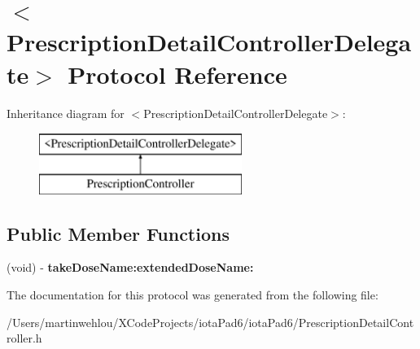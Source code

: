 \hypertarget{protocol_prescription_detail_controller_delegate-p}{
\section{$<$PrescriptionDetailControllerDelegate$>$ Protocol Reference}
\label{protocol_prescription_detail_controller_delegate-p}
}
Inheritance diagram for $<$PrescriptionDetailControllerDelegate$>$:\begin{figure}[H]
\begin{center}
\leavevmode
\includegraphics[height=2.000000cm]{protocol_prescription_detail_controller_delegate-p}
\end{center}
\end{figure}
\subsection*{Public Member Functions}
\begin{DoxyCompactItemize}
\item 
\hypertarget{protocol_prescription_detail_controller_delegate-p_a8622b6c9b94bb58b90e0f7d518f74ef1}{
(void) -\/ {\bfseries takeDoseName:extendedDoseName:}}
\label{protocol_prescription_detail_controller_delegate-p_a8622b6c9b94bb58b90e0f7d518f74ef1}

\end{DoxyCompactItemize}


The documentation for this protocol was generated from the following file:\begin{DoxyCompactItemize}
\item 
/Users/martinwehlou/XCodeProjects/iotaPad6/iotaPad6/PrescriptionDetailController.h\end{DoxyCompactItemize}
